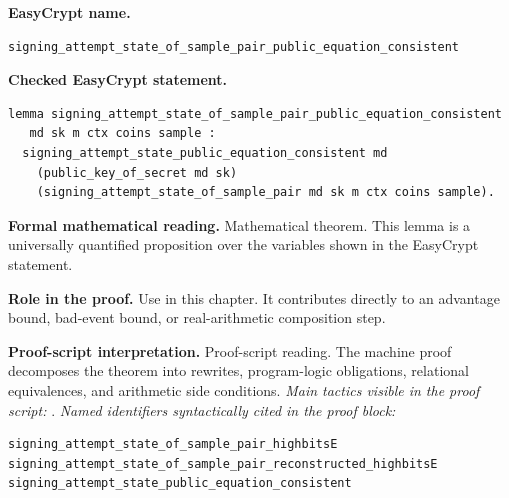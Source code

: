\begin{formaltheorem}
\noindent\textbf{EasyCrypt name.}
\begin{lstlisting}[language=EasyCrypt,basicstyle=\ttfamily\scriptsize]
signing_attempt_state_of_sample_pair_public_equation_consistent
\end{lstlisting}
\noindent\textbf{Checked EasyCrypt statement.}
\begin{lstlisting}[language=EasyCrypt,basicstyle=\ttfamily\scriptsize]
lemma signing_attempt_state_of_sample_pair_public_equation_consistent
   md sk m ctx coins sample :
  signing_attempt_state_public_equation_consistent md
    (public_key_of_secret md sk)
    (signing_attempt_state_of_sample_pair md sk m ctx coins sample).
\end{lstlisting}
\noindent\textbf{Formal mathematical reading.}
Mathematical theorem. This lemma is a universally quantified proposition over the variables shown in the EasyCrypt statement.

\noindent\textbf{Role in the proof.}
Use in this chapter. It contributes directly to an advantage bound, bad-event bound, or real-arithmetic composition step.

\noindent\textbf{Proof-script interpretation.}
Proof-script reading. The machine proof decomposes the theorem into rewrites, program-logic obligations, relational equivalences, and arithmetic side conditions.
\emph{Main tactics visible in the proof script:} .
\emph{Named identifiers syntactically cited in the proof block:}
\begin{lstlisting}[language=EasyCrypt,basicstyle=\ttfamily\scriptsize]
signing_attempt_state_of_sample_pair_highbitsE
signing_attempt_state_of_sample_pair_reconstructed_highbitsE
signing_attempt_state_public_equation_consistent
\end{lstlisting}

\end{formaltheorem}

